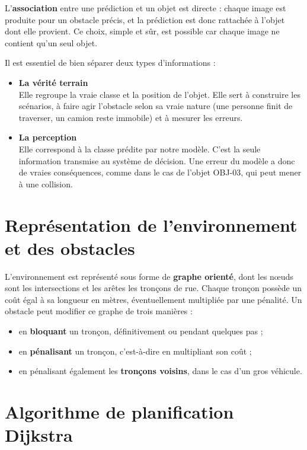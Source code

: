 L'\textbf{association} entre une prédiction et un objet est directe : chaque image est produite pour un obstacle précis, et la prédiction est donc rattachée à l'objet dont elle provient. Ce choix, simple et sûr, est possible car chaque image ne contient qu'un seul objet.

Il est essentiel de bien séparer deux types d'informations :

\begin{itemize}
  \item \textbf{La vérité terrain}\\
  Elle regroupe la vraie classe et la position de l'objet. Elle sert à construire les scénarios, à faire agir l'obstacle selon sa vraie nature (une personne finit de traverser, un camion reste immobile) et à mesurer les erreurs.
  \item \textbf{La perception}\\
  Elle correspond à la classe prédite par notre modèle. C'est la seule information transmise au système de décision. Une erreur du modèle a donc de vraies conséquences, comme dans le cas de l'objet OBJ-03, qui peut mener à une collision.
\end{itemize}

\section{Représentation de l'environnement et des obstacles}

L'environnement est représenté sous forme de \textbf{graphe orienté}, dont les nœuds sont les intersections et les arêtes les tronçons de rue. Chaque tronçon possède un coût égal à sa longueur en mètres, éventuellement multipliée par une pénalité. Un obstacle peut modifier ce graphe de trois manières :

\begin{itemize}
  \item en \textbf{bloquant} un tronçon, définitivement ou pendant quelques pas ;
  \item en \textbf{pénalisant} un tronçon, c'est-à-dire en multipliant son coût ;
  \item en pénalisant également les \textbf{tronçons voisins}, dans le cas d'un gros véhicule.
\end{itemize}

\section{Algorithme de planification Dijkstra}

